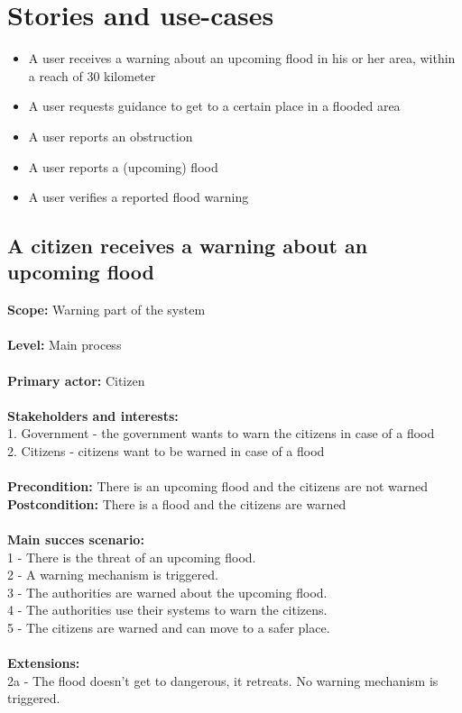 \section{Stories and use-cases}
	\begin{itemize}
		\item A user receives a warning about an upcoming flood in his or her area, within a reach of 30 kilometer
		\item A user requests guidance to get to a certain place in a flooded area
		\item A user reports an obstruction
		\item A user reports a (upcoming) flood
		\item A user verifies a reported flood warning
	\end{itemize} 

\subsection{A citizen receives a warning about an upcoming flood}
\textbf{Scope:} Warning part of the system\\\\
\textbf{Level:} Main process\\\\
\textbf{Primary actor:} Citizen\\\\
\textbf{Stakeholders and interests:}\\
	1. Government - the government wants to warn the citizens in case of a flood \\
	2. Citizens - citizens want to be warned in case of a flood \\\\
\textbf{Precondition:} There is an upcoming flood and the citizens are not warned\\
\textbf{Postcondition:} There is a flood and the citizens are warned\\\\
\textbf{Main succes scenario:} \\
1 - There is the threat of an upcoming flood.\\
2 - A warning mechanism is triggered.\\
3 - The authorities are warned about the upcoming flood.\\
4 - The authorities use their systems to warn the citizens.\\
5 - The citizens are warned and can move to a safer place.\\\\
\textbf{Extensions:} \\
2a - The flood doesn't get to dangerous, it retreats. No warning mechanism is triggered.


